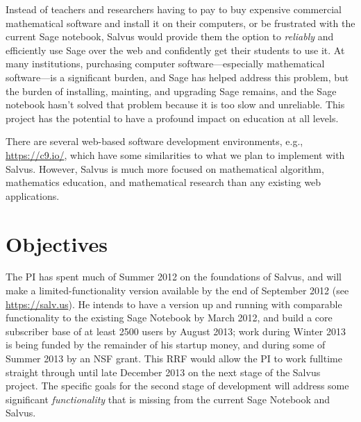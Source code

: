 \documentclass[11pt]{article}
\begin{document}
Instead of teachers and researchers having to pay to buy expensive
commercial mathematical software and install it on their computers, or
be frustrated with the current Sage notebook, Salvus would provide
them the option to {\em reliably} and efficiently use Sage over the
web and confidently get their students to use it.  At many
institutions, purchasing computer software---especially mathematical
software---is a significant burden, and Sage has helped address this
problem, but the burden of installing, mainting, and upgrading Sage
remains, and the Sage notebook hasn't solved that problem because it
is too slow and unreliable.  This project has the potential to have a
profound impact on education at all levels.

There are several web-based software development environments, e.g.,
\url{https://c9.io/}, which have some similarities to what we plan to
implement with Salvus.  However, Salvus is much more focused on
mathematical algorithm, mathematics education, and
mathematical research than any existing web applications.

\section{Objectives}

The PI has spent much of Summer 2012 on the foundations of Salvus, and
will make a limited-functionality version available by the end of
September 2012 (see \url{https://salv.us}).  He intends to have a
version up and running with comparable functionality to the existing
Sage Notebook by March 2012, and build a core subscriber base of at
least 2500 users by August 2013; work during Winter 2013 is being
funded by the remainder of his startup money, and during some of
Summer 2013 by an NSF grant.  This RRF would allow the PI to work
fulltime straight through until late December 2013 on the next stage
of the Salvus project. The specific goals for the second stage of
development will address some significant {\em functionality} that is
missing from the current Sage Notebook and Salvus.
\end{document}
